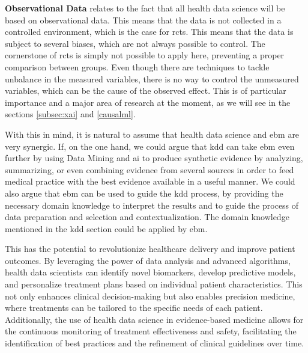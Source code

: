 \textbf{Observational Data} relates to the fact that all health data science will be based on observational data. This means that the data is not collected in a controlled environment, which is the case for \acp{rct}. This means that the data is subject to several biases, which are not always possible to control. The cornerstone of \acp{rct} is simply not possible to apply here, preventing a proper comparison between groups. Even though there are techniques to tackle unbalance in the measured variables, there is no way to control the unmeasured variables, which can be the cause of the observed effect. This is of particular importance and a major area of research at the moment, as we will see in the sections \ref{subsec:xai} and \ref{causalml}.

With this in mind, it is natural to assume that health data science and \ac{ebm} are very synergic. If, on the one hand, we could argue that \ac{kdd} can take \ac{ebm} even further by using Data Mining and \ac{ai} to produce synthetic evidence by analyzing, summarizing, or even combining evidence from several sources in order to feed medical practice with the best evidence available in a useful manner. We could also argue that \ac{ebm} can be used to guide the \ac{kdd} process, by providing the necessary domain knowledge to interpret the results and to guide the process of data preparation and selection and contextualization. The domain knowledge mentioned in the \ac{kdd} section could be applied by \ac{ebm}.

This has the potential to revolutionize healthcare delivery and improve patient outcomes. By leveraging the power of data analysis and advanced algorithms, health data scientists can identify novel biomarkers, develop predictive models, and personalize treatment plans based on individual patient characteristics. This not only enhances clinical decision-making but also enables precision medicine, where treatments can be tailored to the specific needs of each patient. Additionally, the use of health data science in evidence-based medicine allows for the continuous monitoring of treatment effectiveness and safety, facilitating the identification of best practices and the refinement of clinical guidelines over time.

